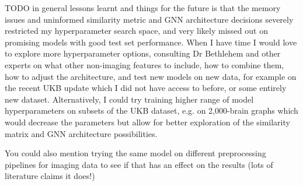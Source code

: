 TODO in general lessons learnt and things for the future is that the memory issues and uninformed similarity metric and GNN architecture decisions severely restricted my hyperparameter search space, and very likely missed out on promising models with good test set performance. When I have time I would love to explore more hyperparameter options, consulting Dr Bethlehem and other experts on what other non-imaging features to include, how to combine them, how to adjust the architecture, and test new models on new data, for example on the recent UKB update which I did not have access to before, or some entirely new dataset. Alternatively, I could try training higher range of model hyperparameters on subsets of the UKB dataset, e.g. on 2,000-brain graphs which would decrease the parameters but allow for better exploration of the similarity matrix and GNN architecture possibilities.

You could also mention trying the same model on different preprocessing pipelines for imaging data to see if that has an effect on the results (lots of literature claims it does!)
